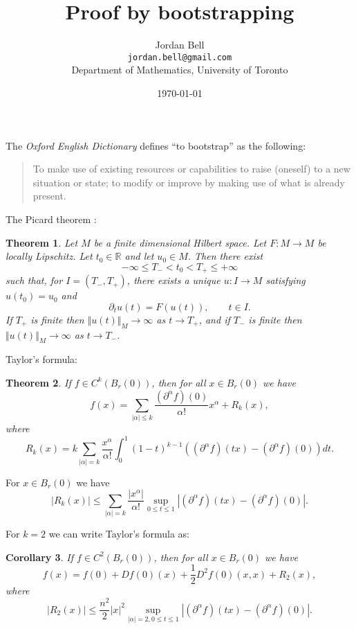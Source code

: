 \documentclass{article}
\newcommand{\norm}[1]{\Vert #1 \Vert}
\newtheorem{theorem}{Theorem}
\newtheorem{corollary}[theorem]{Corollary}
\begin{document}
\title{Proof by bootstrapping}
\author{Jordan Bell\\ \texttt{jordan.bell@gmail.com}\\Department of Mathematics, University of Toronto}
\date{\today}
\maketitle

The {\em Oxford English Dictionary} defines ``to bootstrap'' as the following:
\begin{quote}
To make use of existing resources or capabilities to raise (oneself) to a new situation or state; to
modify or improve by making use of what is already present.
\end{quote}

The Picard theorem \cite[p.~14, Theorem 1.17]{tao}:

\begin{theorem}
Let $M$ be a finite dimensional Hilbert space. Let $F:M \to M$ be locally Lipschitz. Let $t_0 \in \mathbb{R}$ and let $u_0 \in M$. Then there exist
\[
-\infty \leq T_- < t_0 < T_+ \leq +\infty
\]
such that, for $I=(T_-,T_+)$, there exists a unique $u:I \to M$ satisfying  $u(t_0)=u_0$ and
\[
\partial_t u(t)=F(u(t)), \qquad t \in I.
\]
If $T_+$ is finite then $\norm{u(t)}_M \to \infty$ as $t \to T_+$, and if $T_-$ is finite then $\norm{u(t)}_M \to \infty$ as $t \to T_-$. 
\end{theorem}




Taylor's formula:
\begin{theorem}
If $f \in C^k(B_r(0))$, then for all $x \in B_r(0)$ we have
\[
f(x)=\sum_{|\alpha| \leq k} \frac{(\partial^\alpha f)(0)}{\alpha!}x^\alpha+R_k(x),
\]
where
\[
R_k(x)=k\sum_{|\alpha|=k} \frac{x^\alpha}{\alpha!}  \int_0^1 (1-t)^{k-1} ((\partial^\alpha f)(tx)-(\partial^\alpha f)(0))dt.
\]
\end{theorem}

For $x \in B_r(0)$ we have 
\[
|R_k(x)| \leq \sum_{|\alpha|=k} \frac{|x^\alpha|}{\alpha!} \sup_{0 \leq t \leq 1}  |(\partial^\alpha f)(tx)-(\partial^\alpha f)(0)|.
\]

For $k=2$ we can write Taylor's formula as:

\begin{corollary}
If $f \in C^2(B_r(0))$, then for all $x \in B_r(0)$ we have
\[
f(x)=f(0)+Df(0)(x)+\frac{1}{2}D^2f(0)(x,x)+R_2(x),
\]
where
\[
|R_2(x)| \leq \frac{n^2}{2} |x|^2 \sup_{|\alpha|=2, 0 \leq t \leq 1} |(\partial^\alpha f)(tx)-(\partial^\alpha f)(0)|.
\]
\end{corollary}
\end{document}
